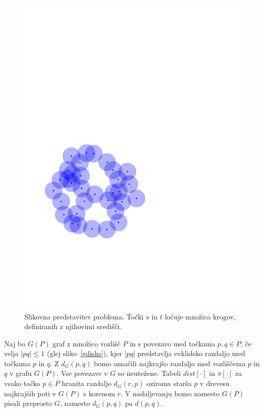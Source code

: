 \documentclass[a4paper, 12pt]{book}
\begin{document}
\begin{figure}
\centerline{\includegraphics[scale=0.6,page=4]{pics/unitdisks.pdf}}
\caption{Slikovna predstavitev problema. Točki $s$ in $t$ ločuje množica krogov, definiranih z njihovimi središči.}
\label{separation}
\end{figure}

Naj bo $G(P)$ graf z množico vozlišč $P$ in s povezavo med točkama $p,q \in P$, če velja $|pq|\le 1$ (glej sliko~\ref{gdisks}), kjer $|pq|$ predstavlja evklidsko razdaljo med točkama $p$ in $q$. Z $d_G(p,q)$ bomo označili najkrajšo razdaljo med vozliščema $p$ in $q$ v grafu $G(P)$. Vse povezave v $G$ so neutežene. Tabeli $dist[\cdot]$ in $\pi[\cdot]$ za vsako točko $p\in P$ hranita razdaljo $d_G(r, p)$ oziroma starša $p$ v drevesu najkrajših poti v $G(P)$ s korenom $r$. V nadaljevanju bomo namesto $G(P)$ pisali preprosto $G$, namesto $d_G(p, q)$ pa $d(p, q)$.
\end{document}
